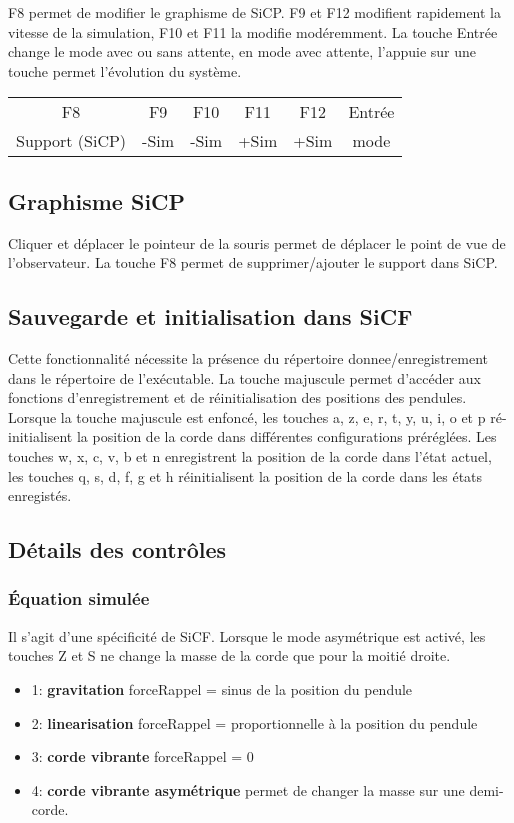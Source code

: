 %
F8 permet de modifier  le graphisme de SiCP. {\sf F9} et {\sf F12} modifient rapidement la vitesse de la simulation, {\sf F10} et {\sf F11} la modifie modéremment. La touche {\sf Entrée} change le mode avec ou sans attente, en mode avec attente, l'appuie sur une touche permet l'évolution du système.
\begin{center}
\begin{tabular}{cccccc}
\sf F8 &\sf F9 &\sf F10 &\sf F11 &\sf F12 & \sf Entrée \\
Support (SiCP) & -Sim & -Sim & +Sim & +Sim & mode\\
\end{tabular}
\end{center}
%
%
\subsection{Graphisme SiCP}
Cliquer et déplacer le pointeur de la souris permet de déplacer le point de vue de l'observateur. La touche {\sf F8} permet de supprimer/ajouter le support dans SiCP.
%
\subsection{Sauvegarde et initialisation dans SiCF}
%
Cette fonctionnalité nécessite la présence du répertoire donnee/enregistrement dans le répertoire de l'exécutable.
La touche majuscule permet d'accéder aux fonctions d'enregistrement et de réinitialisation des positions des pendules. Lorsque la touche majuscule est enfoncé, les touches {\sf a}, {\sf z}, {\sf e}, {\sf r}, {\sf t}, {\sf y}, {\sf u}, {\sf i}, {\sf o} et {\sf p} ré-initialisent la position de la corde dans différentes configurations préréglées. Les touches {\sf w}, {\sf x}, {\sf c}, {\sf v}, {\sf b} et {\sf n} enregistrent la position de la corde dans l'état actuel, les touches {\sf q}, {\sf s}, {\sf d}, {\sf f}, {\sf g} et {\sf h} réinitialisent la position de la corde dans les états enregistés.
%
\subsection{Détails des contrôles}
%
%
\subsubsection{Équation simulée}
%
Il s'agit d'une spécificité de SiCF. Lorsque le mode asymétrique est activé, les touches {\sf Z} et {\sf S} ne change la masse de la corde que pour la moitié droite. 
%
\begin{itemize}[leftmargin=2cm, label=, itemsep=0pt]
\item 1: {\bf gravitation} forceRappel = sinus de la position du pendule
\item 2: {\bf linearisation} forceRappel = proportionnelle à la position du pendule
\item 3: {\bf corde vibrante} forceRappel = 0
\item 4: {\bf corde vibrante asymétrique} permet de changer la masse sur une demi-corde.
\end{itemize}
%
